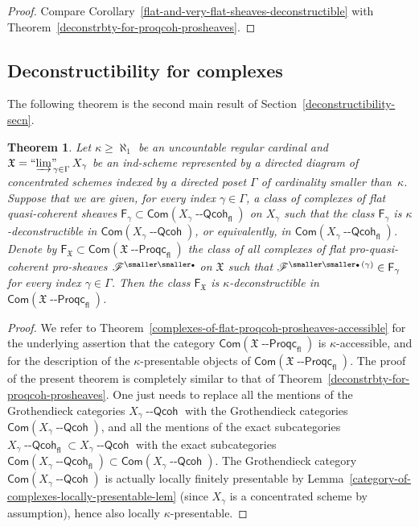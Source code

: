 \documentclass[12pt,a4paper]{amsart}
\newcommand{\+}{\protect\nobreakdash-}
\renewcommand{\:}{\colon}
\newcommand{\bu}{{\text{\smaller\smaller$\scriptstyle\bullet$}}}
\newcommand{\Qcoh}{{\operatorname{\mathsf{--Qcoh}}}}
\newcommand{\Proqc}{{\operatorname{\mathsf{--Proqc}}}}
\newcommand{\fl}{\mathsf{fl}}
\newcommand{\Com}{\mathsf{Com}}
\newcommand{\ilim}
 {\mathop{\text{\normalfont``$\varinjlim$''\!\!}}\nolimits}
\newcommand{\sF}{\mathsf F}
\newcommand{\fX}{\mathfrak X}
\newcommand{\rF}{\mathscr F}
\theoremstyle{plain}
\newtheorem{thm}{Theorem}[section]
\theoremstyle{definition}
\begin{document}
\begin{proof}
 Compare Corollary~\ref{flat-and-very-flat-sheaves-deconstructible}
with Theorem~\ref{deconstrbty-for-proqcoh-prosheaves}.
\end{proof}

\subsection{Deconstructibility for complexes}
  The following theorem is the second main result of
Section~\ref{deconstructibility-secn}.

\begin{thm} \label{deconstrbty-for-complexes-of-proqcoh-prosheaves}
 Let\/ $\kappa\ge\aleph_1$ be an uncountable regular cardinal and\/
$\fX=\ilim_{\gamma\in\Gamma}X_\gamma$ be an ind-scheme represented
by a directed diagram of concentrated schemes indexed by a directed
poset\/ $\Gamma$ of cardinality smaller than\/~$\kappa$.
 Suppose that we are given, for every index\/ $\gamma\in\Gamma$,
a class of complexes of flat quasi-coherent sheaves $\sF_\gamma\subset
\Com(X_\gamma\Qcoh_\fl)$ on $X_\gamma$ such that the class\/
$\sF_\gamma$ is\/ $\kappa$\+deconstructible in\/ $\Com(X_\gamma\Qcoh)$,
or equivalently, in\/ $\Com(X_\gamma\Qcoh_\fl)$.
 Denote by\/ $\sF_\fX\subset\Com(\fX\Proqc_\fl)$ the class of all
complexes of flat pro-quasi-coherent pro-sheaves\/ $\rF^\bu$ on\/ $\fX$
such that\/ $\rF^{\bu\,(\gamma)}\in\sF_\gamma$ for every index\/
$\gamma\in\Gamma$.
 Then the class\/ $\sF_\fX$ is $\kappa$\+deconstructible in\/
$\Com(\fX\Proqc_\fl)$.
\end{thm}

\begin{proof}
 We refer to
Theorem~\ref{complexes-of-flat-proqcoh-prosheaves-accessible} for
the underlying assertion that the category $\Com(\fX\Proqc_\fl)$
is $\kappa$\+accessible, and for the description of
the $\kappa$\+presentable objects of $\Com(\fX\Proqc_\fl)$.
 The proof of the present theorem is completely similar to
that of Theorem~\ref{deconstrbty-for-proqcoh-prosheaves}.
 One just needs to replace all the mentions of the Grothendieck
categories $X_\gamma\Qcoh$ with the Grothendieck categories
$\Com(X_\gamma\Qcoh)$, and all the mentions of the exact subcategories
$X_\gamma\Qcoh_\fl\subset X_\gamma\Qcoh$ with the exact subcategories
$\Com(X_\gamma\Qcoh_\fl)\subset\Com(X_\gamma\Qcoh)$.
 The Grothendieck category $\Com(X_\gamma\Qcoh)$ is actually
locally finitely presentable by
Lemma~\ref{category-of-complexes-locally-presentable-lem} (since
$X_\gamma$ is a concentrated scheme by assumption), hence also
locally $\kappa$\+presentable.
\end{proof}
\end{document}
